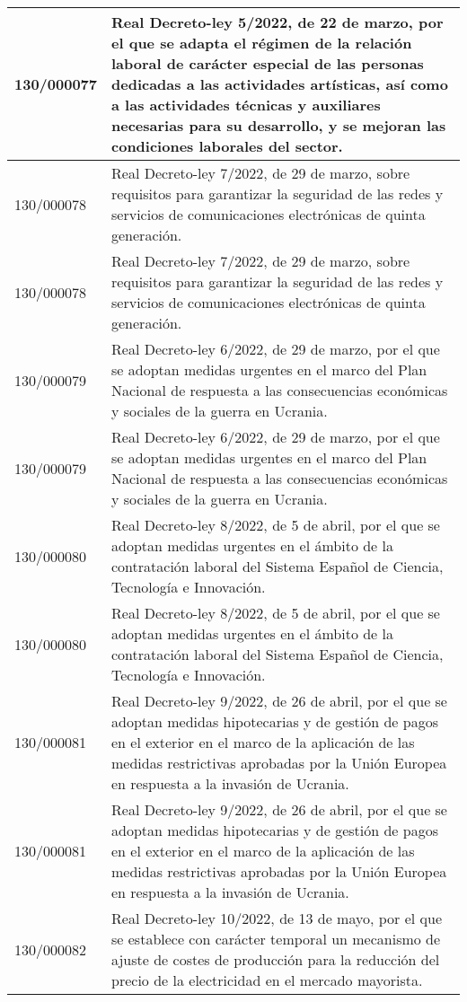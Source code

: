 {\begin{table}[H]
\begin{center}
\begin{tabularx}{\linewidth}{| l | X |}
\hline
130/000077 & Real Decreto-ley 5/2022, de 22 de marzo, por el que se adapta el régimen de la relación laboral de carácter especial de las personas dedicadas a las actividades artísticas, así como a las actividades técnicas y auxiliares necesarias para su desarrollo, y se mejoran las condiciones laborales del sector. \\
\hline
130/000078 & Real Decreto-ley 7/2022, de 29 de marzo, sobre requisitos para garantizar la seguridad de las redes y servicios de comunicaciones electrónicas de quinta generación. \\
\hline
130/000078 & Real Decreto-ley 7/2022, de 29 de marzo, sobre requisitos para garantizar la seguridad de las redes y servicios de comunicaciones electrónicas de quinta generación. \\
\hline
130/000079 & Real Decreto-ley 6/2022, de 29 de marzo, por el que se adoptan medidas urgentes en el marco del Plan Nacional de respuesta a las consecuencias económicas y sociales de la guerra en Ucrania. \\
\hline
130/000079 & Real Decreto-ley 6/2022, de 29 de marzo, por el que se adoptan medidas urgentes en el marco del Plan Nacional de respuesta a las consecuencias económicas y sociales de la guerra en Ucrania. \\
\hline
130/000080 & Real Decreto-ley 8/2022, de 5 de abril, por el que se adoptan medidas urgentes en el ámbito de la contratación laboral del Sistema Español de Ciencia, Tecnología e Innovación. \\
\hline
130/000080 & Real Decreto-ley 8/2022, de 5 de abril, por el que se adoptan medidas urgentes en el ámbito de la contratación laboral del Sistema Español de Ciencia, Tecnología e Innovación. \\
\hline
130/000081 & Real Decreto-ley 9/2022, de 26 de abril, por el que se adoptan medidas hipotecarias y de gestión de pagos en el exterior en el marco de la aplicación de las medidas restrictivas aprobadas por la Unión Europea en respuesta a la invasión de Ucrania. \\
\hline
130/000081 & Real Decreto-ley 9/2022, de 26 de abril, por el que se adoptan medidas hipotecarias y de gestión de pagos en el exterior en el marco de la aplicación de las medidas restrictivas aprobadas por la Unión Europea en respuesta a la invasión de Ucrania. \\
\hline
130/000082 & Real Decreto-ley 10/2022, de 13 de mayo, por el que se establece con carácter temporal un mecanismo de ajuste de costes de producción para la reducción del precio de la electricidad en el mercado mayorista. \\

\end{tabularx}
\end{center}
\end{table}}
